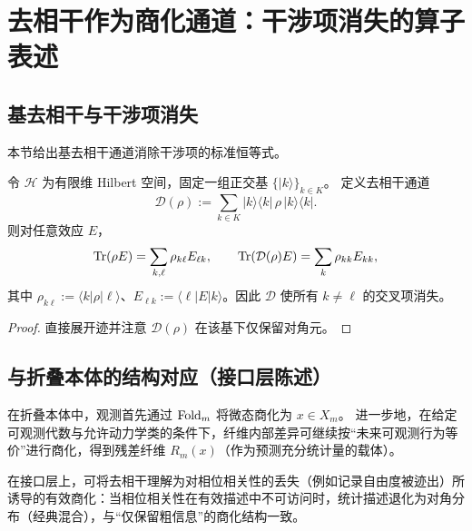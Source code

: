 \section{去相干作为商化通道：干涉项消失的算子表述}

\subsection{基去相干与干涉项消失}

本节给出基去相干通道消除干涉项的标准恒等式。

\begin{lemma}[基去相干消除干涉项]
\label{lem:dephasing_kills_interference}
令 $\mathcal H$ 为有限维 Hilbert 空间，固定一组正交基 $\{|k\rangle\}_{k\in K}$。
定义去相干通道
$$
\mathcal D(\rho):=\sum_{k\in K}|k\rangle\langle k|\,\rho\,|k\rangle\langle k|.
$$
则对任意效应 $E$，
$$
\mathrm{Tr}(\rho E)=\sum_{k,\ell}\rho_{k\ell}E_{\ell k},
\qquad
\mathrm{Tr}(\mathcal D(\rho)E)=\sum_{k}\rho_{kk}E_{kk},
$$
其中 $\rho_{k\ell}:=\langle k|\rho|\ell\rangle$、$E_{\ell k}:=\langle \ell|E|k\rangle$。因此 $\mathcal D$ 使所有 $k\neq \ell$ 的交叉项消失。
\end{lemma}

\begin{proof}
直接展开迹并注意 $\mathcal D(\rho)$ 在该基下仅保留对角元。
\end{proof}

\subsection{与折叠本体的结构对应（接口层陈述）}

在折叠本体中，观测首先通过 $\mathrm{Fold}_m$ 将微态商化为 $x\in X_m$。
进一步地，在给定可观测代数与允许动力学类的条件下，纤维内部差异可继续按“未来可观测行为等价”进行商化，得到残差纤维 $R_m(x)$（作为预测充分统计量的载体）。

在接口层上，可将去相干理解为对相位相关性的丢失（例如记录自由度被迹出）所诱导的有效商化：当相位相关性在有效描述中不可访问时，统计描述退化为对角分布（经典混合），与“仅保留粗信息”的商化结构一致。

